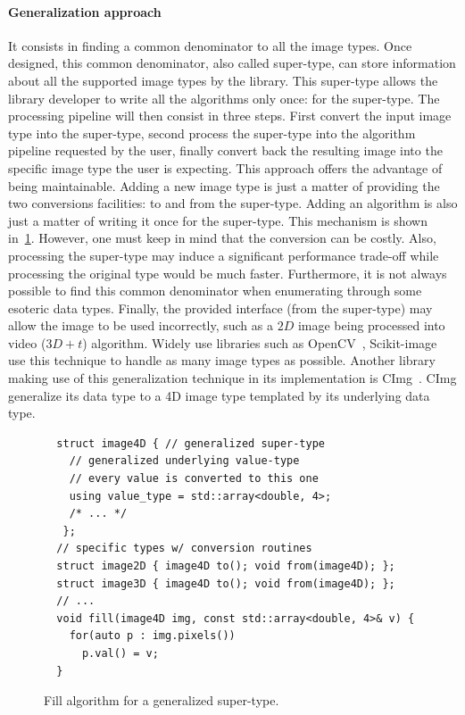 \paragraph{Generalization approach} It consists in finding a common denominator to all the image types. Once designed,
this common denominator, also called super-type, can store information about all the supported image types by the
library. This super-type allows the library developer to write all the algorithms only once: for the super-type. The
processing pipeline will then consist in three steps. First convert the input image type into the super-type, second
process the super-type into the algorithm pipeline requested by the user, finally convert back the resulting image into
the specific image type the user is expecting. This approach offers the advantage of being maintainable. Adding a new
image type is just a matter of providing the two conversions facilities: to and from the super-type. Adding an algorithm
is also just a matter of writing it once for the super-type. This mechanism is shown in~\ref{code:gen.generalized}.
However, one must keep in mind that the conversion can be costly. Also, processing the super-type may induce a
significant performance trade-off while processing the original type would be much faster. Furthermore, it is not always
possible to find this common denominator when enumerating through some esoteric data types. Finally, the provided
interface (from the super-type) may allow the image to be used incorrectly, such as a \(2D\) image being processed into
video (\(3D+t\)) algorithm. Widely use libraries such as OpenCV~\parencite{bradski.2000.opencv},
Scikit-image~\parencite{vanderwalt.2014.skimage} use this technique to handle as many image types as possible. Another
library making use of this generalization technique in its implementation is CImg~\parencite{tschumperle.2012.cimg}.
CImg generalize its data type to a 4D image type templated by its underlying data type.

\begin{figure}[htbp]
  \centering
  \begin{verbatim}
  struct image4D { // generalized super-type
    // generalized underlying value-type
    // every value is converted to this one
    using value_type = std::array<double, 4>;
    /* ... */
   };
  // specific types w/ conversion routines
  struct image2D { image4D to(); void from(image4D); };
  struct image3D { image4D to(); void from(image4D); };
  // ...
  void fill(image4D img, const std::array<double, 4>& v) {
    for(auto p : img.pixels())
      p.val() = v;
  }
  \end{verbatim}
  \caption{Fill algorithm for a generalized super-type.}
  \label{code:gen.generalized}
\end{figure}

